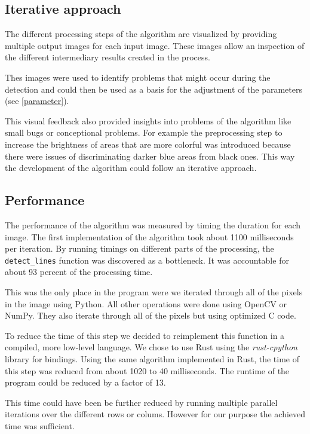 \documentclass[serif,article,noparskip]{agse-thesis}
\begin{document}
\subsection{Iterative approach}

The different processing steps of the algorithm are visualized by providing
multiple output images for each input image. These images allow an inspection
of the different intermediary results created in the process.

Thes images were used to identify problems that might occur during the detection
and could then be used as a basis for the adjustment of the parameters (see
\ref{parameter}).

This visual feedback also provided insights into problems of the algorithm like
small bugs or conceptional problems. For example the preprocessing step to
increase the brightness of areas that are more colorful was introduced because
there were issues of discriminating darker blue areas from black ones. This way
the development of the algorithm could follow an iterative approach.

\subsection{Performance} \label{performance}

The performance of the algorithm was measured by timing the duration for each
image. The first implementation of the algorithm took about 1100 milliseconds per
iteration. By running timings on different parts of the processing, the
\texttt{detect\_lines} function was discovered as a bottleneck. It was
accountable for about 93 percent of the processing time.

This was the only place in the program were we iterated through all of the pixels
in the image using Python. All other operations were done using OpenCV or NumPy.
They also iterate through all of the pixels but using optimized C code.

To reduce the time of this step we decided to reimplement this function in a
compiled, more low-level language. We chose to use Rust using the \textit{rust-cpython}
library for bindings. Using the same algorithm implemented in Rust, the time of
this step was reduced from about 1020 to 40 milliseconds. The runtime of the
program could be reduced by a factor of 13.

This time could have been be further reduced by running multiple parallel
iterations over the different rows or colums. However for our purpose the
achieved time was sufficient.
\end{document}
